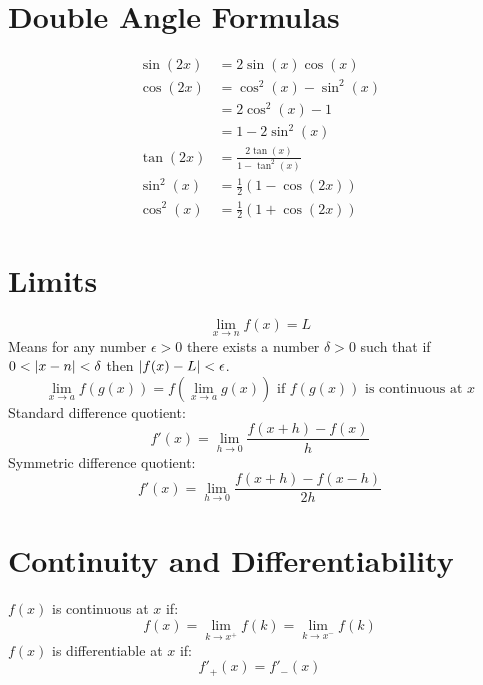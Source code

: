 \documentclass[12pt]{article}
\DeclarePairedDelimiter\abs{\lvert}{\rvert}
\newcommand*{\fixmath}{\makebox{}\vspace{\glueexpr-\baselineskip-\abovedisplayskip}}
\newenvironment{rmaskip}{\setlength{\abovedisplayskip}{0pt}\fixmath%
  \ignorespaces}{\ignorespacesafterend}
\newenvironment{rmbskip}{\setlength{\belowdisplayskip}{0pt}\ignorespaces}%
  {\ignorespacesafterend}
\newenvironment{rmskip}{\setlength{\abovedisplayskip}{0pt}%
  \setlength{\belowdisplayskip}{0pt}\fixmath\ignorespaces}%
  {\ignorespacesafterend}
\begin{document}
\section*{Double Angle Formulas}
\begin{rmskip}
  \begin{align*}
    \sin(2x) &= 2\sin(x)\cos(x)\\
    \cos(2x) &= \cos^2(x) - \sin^2(x)\\
      &= 2\cos^2(x) - 1\\
      &= 1-2\sin^2(x)\\
    \tan(2x) &= \frac{2\tan(x)}{1 - \tan^2(x)}\\
    \sin^2(x) &= \frac{1}{2}(1-\cos(2x))\\
    \cos^2(x) &= \frac{1}{2}(1+\cos(2x))
  \end{align*}
\end{rmskip}
\section*{Limits}
\begin{rmaskip}
  \[
    \lim_{x \to n} f(x) = L
  \]
\end{rmaskip}
Means for any number \(\epsilon > 0\) there exists a number \(\delta > 0\) such
that if \(0 < \abs*{x-n} < \delta\) then \(\abs*{f(x)-L} < \epsilon\).
\[
  \lim_{x \to a}f(g(x)) = f\left(\lim_{x \to a}g(x)\right) \text{ if } f(g(x))
  \text{ is continuous at } x
\]
Standard difference quotient:
\[
  f'(x) = \lim_{h \to 0}\frac{f(x+h) - f(x)}{h}
\]
Symmetric difference quotient:
\begin{rmbskip}
  \[
    f'(x) = \lim_{h \to 0}\frac{f(x+h) - f(x-h)}{2h}
  \]
\end{rmbskip}
\section*{Continuity and Differentiability}
\(f(x)\) is continuous at \(x\) if:
\[
  f(x) = \lim_{k \to x^+}f(k) = \lim_{k \to x^-}f(k)
\]
\(f(x)\) is differentiable at \(x\) if:
\begin{rmbskip}
  \[
    f'_+(x) = f'_-(x)
  \]
\end{rmbskip}
\end{document}
